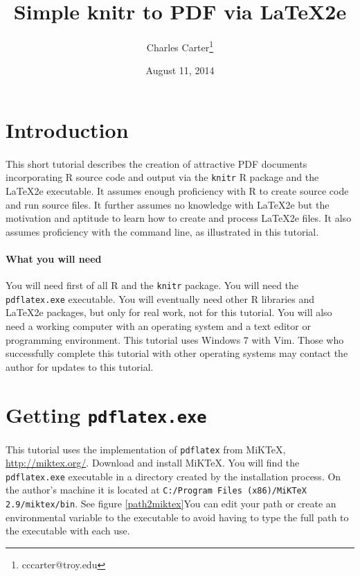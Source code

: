\documentclass{article}
\title{Simple knitr to PDF via \LaTeX2e{}}
\author{Charles Carter\thanks{cccarter@troy.edu}}
\date{August 11, 2014}
\begin{document}
\maketitle{}

\section{Introduction}

\paragraph{}This short tutorial describes the creation of attractive PDF documents incorporating \textsf{R} source code and output via the \texttt{knitr} \textsf{R} package and the \LaTeX2e{} executable. It assumes enough proficiency with \textsf{R} to create source code and run source files. It further assumes no knowledge with \LaTeX2e{} but the motivation and aptitude to learn how to create and process \LaTeX2e{} files. It also assumes proficiency with the command line, as illustrated in this tutorial.

\paragraph{What you will need}You will need first of all \textsf{R} and the \texttt{knitr} package. You will need the \texttt{pdflatex.exe} executable. You will eventually need other \textsf{R} libraries and \LaTeX2e{} packages, but only for real work, not for this tutorial. You will also need a working computer with an operating system and a text editor or programming environment. This tutorial uses Windows 7 with Vim. Those who successfully complete this tutorial with other operating systems may contact the author for updates to this tutorial.

\section{Getting \texttt{pdflatex.exe}}

\paragraph{}This tutorial uses the implementation of \texttt{pdflatex} from MiKTeX, \url{http://miktex.org/}. Download and install MiKTeX. You will find the \texttt{pdflatex.exe} executable in a directory created by the installation process. On the author's machine it is located at \texttt{C:/Program Files (x86)/MiKTeX 2.9/miktex/bin}. See figure \ref{path2miktex}You can edit your path or create an environmental variable to the executable to avoid having to type the full path to the executable with each use.
\end{document}
